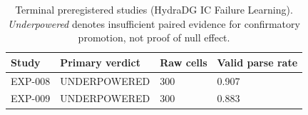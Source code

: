 \begin{table}[t]
  \centering
  \caption{Terminal preregistered studies (HydraDG IC Failure Learning). \emph{Underpowered} denotes insufficient paired evidence for confirmatory promotion, not proof of null effect.}
  \label{tab:terminal}
  \begin{tabular}{llll}
    \toprule
    Study & Primary verdict & Raw cells & Valid parse rate \\
    \midrule
    EXP-008 & UNDERPOWERED & 300 & 0.907 \\
    EXP-009 & UNDERPOWERED & 300 & 0.883 \\
    \bottomrule
  \end{tabular}
\end{table}
